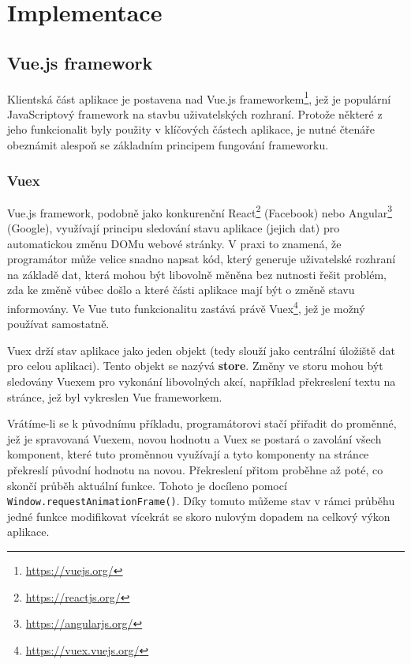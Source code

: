 \chapter{Implementace}

\section{Vue.js framework}
Klientská část aplikace je postavena nad Vue.js frameworkem\footnote{\url{https://vuejs.org/}}, jež je populární JavaScriptový framework na stavbu uživatelských rozhraní. Protože některé z jeho funkcionalit byly použity v klíčových částech aplikace, je nutné čtenáře obeznámit alespoň se základním principem fungování frameworku.

\subsection{Vuex}
Vue.js framework, podobně jako konkurenční React\footnote{\url{https://reactjs.org/}} (Facebook) nebo Angular\footnote{\url{https://angularjs.org/}} (Google), využívají principu sledování stavu aplikace (jejich dat) pro automatickou změnu DOMu webové stránky. V praxi to znamená, že programátor může velice snadno napsat kód, který generuje uživatelské rozhraní na základě dat, která mohou být libovolně měněna bez nutnosti řešit problém, zda ke změně vůbec došlo a které části aplikace mají být o změně stavu informovány. Ve Vue tuto funkcionalitu zastává právě Vuex\footnote{\url{https://vuex.vuejs.org/}}, jež je možný používat samostatně.

Vuex drží stav aplikace jako jeden objekt (tedy slouží jako centrální úložiště dat pro celou aplikaci). Tento objekt se nazývá \textbf{store}. Změny ve storu mohou být sledovány Vuexem pro vykonání libovolných akcí, například překreslení textu na stránce, jež byl vykreslen Vue frameworkem.

\newcommand{\inlinecode}{\texttt}

Vrátíme-li se k původnímu příkladu, programátorovi stačí přiřadit do proměnné, jež je spravovaná Vuexem, novou hodnotu a Vuex se postará o zavolání všech komponent, které tuto proměnnou využívají a tyto komponenty na stránce překreslí původní hodnotu na novou. Překreslení přitom proběhne až poté, co skončí průběh aktuální funkce. Tohoto je docíleno pomocí \\  \texttt{Window.requestAnimationFrame()}. Díky tomuto můžeme stav v rámci průběhu jedné funkce modifikovat vícekrát se skoro nulovým dopadem na celkový výkon aplikace.

